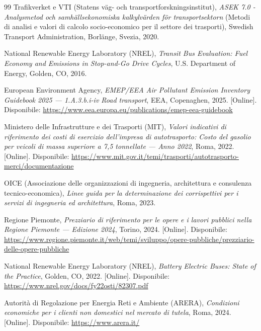 \documentclass[conference]{IEEEtran}
\begin{document}
\begin{thebibliography}{99}
Trafikverket e VTI (Statens väg- och transportforskningsinstitut),
\textit{ASEK 7.0 - Analysmetod och samhällsekonomiska kalkylvärden för transportsektorn} (Metodi di analisi e valori di calcolo socio-economico per il settore dei trasporti),
Swedish Transport Administration, Borlänge, Svezia, 2020.

National Renewable Energy Laboratory (NREL),
\textit{Transit Bus Evaluation: Fuel Economy and Emissions in Stop-and-Go Drive Cycles},
U.S. Department of Energy, Golden, CO, 2016.

European Environment Agency,
\textit{EMEP/EEA Air Pollutant Emission Inventory Guidebook 2025 --- 1.A.3.b.i-iv Road transport},
EEA, Copenaghen, 2025.
[Online]. Disponibile: \url{https://www.eea.europa.eu/publications/emep-eea-guidebook}

Ministero delle Infrastrutture e dei Trasporti (MIT),
\textit{Valori indicativi di riferimento dei costi di esercizio dell'impresa di autotrasporto: Costo del gasolio per veicoli di massa superiore a 7,5 tonnellate --- Anno 2022},
Roma, 2022.
[Online]. Disponibile: \url{https://www.mit.gov.it/temi/trasporti/autotrasporto-merci/documentazione}

OICE (Associazione delle organizzazioni di ingegneria, architettura e consulenza tecnico-economica),
\textit{Linee guida per la determinazione dei corrispettivi per i servizi di ingegneria ed architettura},
Roma, 2023.

Regione Piemonte,
\textit{Prezziario di riferimento per le opere e i lavori pubblici nella Regione Piemonte --- Edizione 2024},
Torino, 2024.
[Online]. Disponibile: \url{https://www.regione.piemonte.it/web/temi/sviluppo/opere-pubbliche/prezziario-delle-opere-pubbliche}

National Renewable Energy Laboratory (NREL),
\textit{Battery Electric Buses: State of the Practice},
Golden, CO, 2022.
[Online]. Disponibile: \url{https://www.nrel.gov/docs/fy22osti/82307.pdf}

Autorità di Regolazione per Energia Reti e Ambiente (ARERA),
\textit{Condizioni economiche per i clienti non domestici nel mercato di tutela},
Roma, 2024.
[Online]. Disponibile: \url{https://www.arera.it/}

\end{thebibliography}
\end{document}

